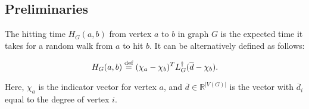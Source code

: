 \subsection{Preliminaries}
\begin{definition} The hitting time $H_G(a,b)$ from vertex $a$ to
$b$ in graph $G$ is the expected time it takes for a random walk
from $a$ to hit $b$. It can be alternatively defined as follows:

\[ H_G(a,b) \stackrel{\textup{def}}{=} (\chi_a - \chi_b)^T L_G^\dag (\overline{d} -
    \chi_b).\]

Here, $\chi_a$ is the indicator vector for vertex $a$, and
$\overline{d} \in \mathbb{R}^{|V(G)|}$ is the
vector with $\overline{d}_i$ equal to the degree of vertex $i$.
\end{definition}
